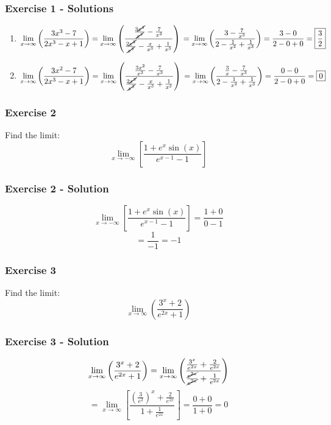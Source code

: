 \documentclass[12pt]{beamer}
\begin{document}
\begin{frame}
	\frametitle{Exercise 1 - Solutions}

	\begin{enumerate}\itemsep2ex
		\item{
		            $\displaystyle\lim_{x\to\infty}\left(\frac{3x^3-7}{2x^3-x+1}\right)=\displaystyle\lim_{x\to\infty}\left(\frac{\frac{3\cancel{x^3}}{\cancel{x^3}}-\frac{7}{x^3}}{\frac{2\cancel{x^3}}{\cancel{x^3}}-\frac{x}{x^3}+\frac{1}{x^3}}\right)\newline=\displaystyle\lim_{x\to\infty}\left(\frac{3-\frac{7}{x^3}}{2-\frac{1}{x^2}+\frac{1}{x^3}}\right)=\frac{3-0}{2-0+0}=\boxed{\frac{3}{2}}$
		      }
		\item{
		            $\displaystyle\lim_{x\to\infty}\left(\frac{3x^2-7}{2x^3-x+1}\right)=\displaystyle\lim_{x\to\infty}\left(\frac{\frac{3x^2}{x^3}-\frac{7}{x^3}}{\frac{2\cancel{x^3}}{\cancel{x^3}}-\frac{x}{x^3}+\frac{1}{x^3}}\right)\newline=\displaystyle\lim_{x\to\infty}\left(\frac{\frac{3}{x}-\frac{7}{x^3}}{2-\frac{1}{x^2}+\frac{1}{x^3}}\right)=\frac{0-0}{2-0+0}=\boxed{0}$
		      }
	\end{enumerate}
\end{frame}
\begin{frame}
	\frametitle{Exercise 2}

	\Large
	Find the limit: \\
	\vfill
	\[\displaystyle\lim_{x\to-\infty}\left[\frac{1+e^x\sin(x)}{e^{x-1}-1}\right]\]
	\vfill
	\vfill
\end{frame}
\begin{frame}
	\frametitle{Exercise 2 - Solution}

	\Large
	\[\displaystyle\lim_{x\to-\infty}\left[\frac{1+e^x\sin(x)}{e^{x-1}-1}\right]=\frac{1+0}{0-1}\]
	\[=\frac{1}{-1}=\boxed{-1}\]
\end{frame}
\begin{frame}
	\frametitle{Exercise 3}

	\Large
	Find the limit: \\
	\vfill
	\[\displaystyle\lim_{x\to\infty}\left(\frac{3^x+2}{e^{2x}+1}\right)\]
	\vfill
	\vfill
\end{frame}
\begin{frame}
	\frametitle{Exercise 3 - Solution}

	\large
	\[\displaystyle\lim_{x\to\infty}\left(\frac{3^x+2}{e^{2x}+1}\right)=\displaystyle\lim_{x\to\infty}\left(\frac{\frac{3^x}{e^{2x}}+\frac{2}{e^{2x}}}{\frac{\cancel{e^{2x}}}{\cancel{e^{2x}}}+\frac{1}{e^{2x}}}\right)\]
	\[=\displaystyle\lim_{x\to\infty}\left[\frac{\left(\frac{3}{e^2}\right)^x+\frac{2}{e^{2x}}}{1+\frac{1}{e^{2x}}}\right]=\frac{0+0}{1+0}=\boxed{0}\]
\end{frame}
\end{document}
